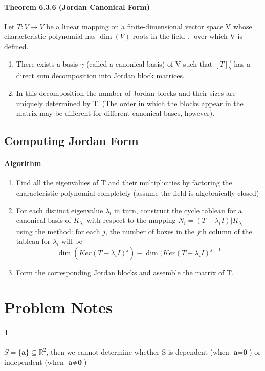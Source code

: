 \documentclass[11pt]{article}
\newcommand{\tb}[1]{\textbf{#1}}
\newcommand{\mb}[1]{\mathbb{#1}}
\newcommand{\real}[0]{\mathbb{R}}
\newcommand{\vo}[0]{\tb{0}}
\begin{document}
{\paragraph{Theorem 6.3.6 (Jordan Canonical Form)} Let $T: V \rightarrow V$ be a linear mapping on a finite-dimensional vector space V whose characteristic polynomial has $\dim(V)$ roots in the field $\mb{F}$ over which V is defined.
\begin{enumerate}
	\item There exists a basis $\gamma$ (called a canonical basis) of V such that $[T]_\gamma^\gamma$ has a direct sum decomposition into Jordan block matrices.
	\item In this decomposition the number of Jordan blocks and their sizes are uniquely determined by T. (The order in which the blocks appear in the matrix may be different for different canonical bases, however).
\end{enumerate} 
\subsection{Computing Jordan Form}
\paragraph{Algorithm}
\begin{enumerate}
	\item Find all the eigenvalues of T and their multiplicities by factoring the characteristic polynomial completely (assume the field is algebraically closed)
	\item For each distinct eigenvalue $\lambda_i$ in turn, construct the cycle tableau for a canonical basis of $K_{\lambda_i}$ with respect to the mapping $N_i = (T - \lambda_iI)|K_{\lambda_i}$ using the method: for each $j$, the number of boxes in the $j$th column of the tableau for $\lambda_i$ will be $$\dim(Ker(T-\lambda_i I)^j) - \dim(Ker(T-\lambda_i I)^{j-1}$$
	\item Form the corresponding Jordan blocks and assemble the matrix of T.
\end{enumerate}


\newpage
\section{Problem Notes}
\paragraph{1} $S = \{\tb{a}\} \subseteq \real^2$, then we cannot determine whether S is dependent (when $\tb{a} = \vo$) or independent (when $\tb{a} \neq \vo$)
}
\end{document}
